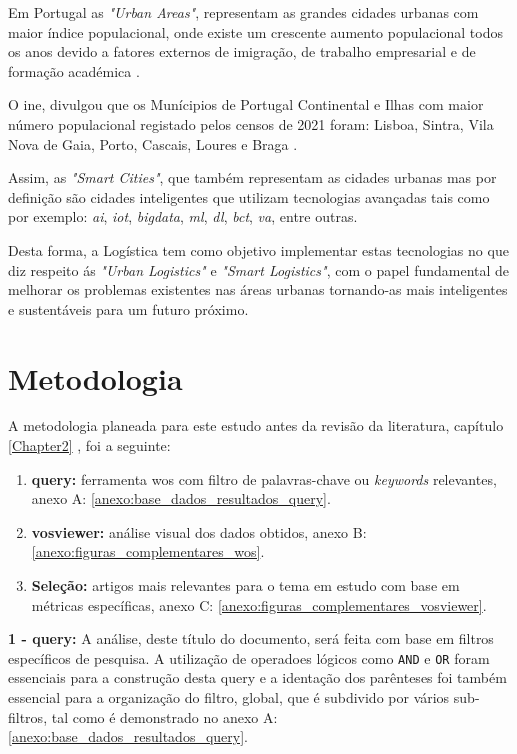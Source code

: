 Em Portugal as \textit{"Urban Areas"}, representam as grandes cidades urbanas com maior índice populacional, onde existe um crescente aumento populacional todos os anos devido a fatores externos de imigração, de trabalho empresarial e de formação académica \cite{INE2022Censos}.

O  \gls{ine}, divulgou que os Munícipios de Portugal Continental e Ilhas com maior número populacional registado pelos censos de 2021 foram:
Lisboa, Sintra, Vila Nova de Gaia, Porto, Cascais, Loures e Braga \cite{INE2022Censos}.

Assim, as \textit{"Smart Cities"}, que também representam as cidades urbanas mas por definição são cidades inteligentes que utilizam tecnologias avançadas  tais como por exemplo: \textit{\gls{ai}}, \textit{\gls{iot}}, \textit{\gls{bigdata}}, \textit{\gls{ml}}, \textit{\gls{dl}}, \textit{\gls{bct}}, \textit{\gls{va}}, entre outras.

Desta forma, a Logística tem como objetivo implementar estas tecnologias no que diz respeito  ás \textit{"Urban Logistics"} e \textit{"Smart Logistics"}, com o papel fundamental de melhorar os problemas existentes nas áreas urbanas tornando-as mais inteligentes  e sustentáveis para um futuro próximo.

\section{Metodologia}
\label{sec:metodologia}
A metodologia planeada para este estudo antes da revisão da literatura, capítulo \ref{Chapter2} , foi a seguinte:
\begin{enumerate}
    \item \textbf{\gls{query}:} ferramenta \gls{wos} com filtro de palavras-chave ou \textit{keywords} relevantes, anexo A: \ref{anexo:base_dados_resultados_query}.
    \item \textbf{\gls{vosviewer}:} análise visual dos dados obtidos, anexo B: \ref{anexo:figuras_complementares_wos}.
    \item \textbf{Seleção:} artigos mais relevantes para o tema em estudo com base em métricas específicas, anexo C: \ref{anexo:figuras_complementares_vosviewer}.
\end{enumerate}

{\setlength{\parindent}{0pt}
\textbf{ 1 - \gls{query}:}
}
A análise, deste título do documento, será feita com base em filtros específicos de pesquisa.
A utilização de operadoes lógicos como \verb|AND| e \verb|OR| foram essenciais para a construção desta \gls{query} e a identação dos parênteses foi também essencial para a organização do filtro, global, que é subdivido por vários sub-filtros, tal como é demonstrado no anexo A: \ref{anexo:base_dados_resultados_query}.

